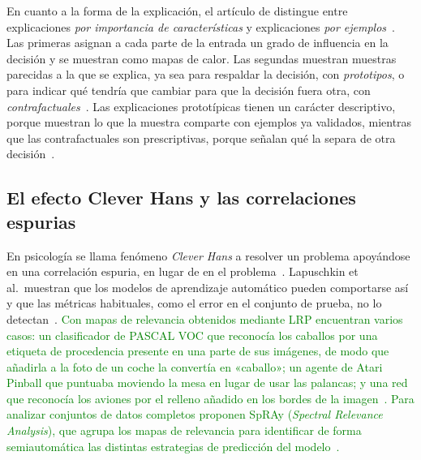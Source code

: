 En cuanto a la forma de la explicación, el artículo de \stoodx distingue entre
explicaciones \emph{por importancia de características} y explicaciones
\emph{por ejemplos}~\cite{sevillano2026}. Las primeras asignan a cada parte de la
entrada un grado de influencia en la decisión y se muestran como mapas de calor.
Las segundas muestran muestras parecidas a la que se explica, ya sea para
respaldar la decisión, con \emph{prototipos}, o para indicar qué tendría que
cambiar para que la decisión fuera otra, con
\emph{contrafactuales}~\cite{sevillano2026}. Las explicaciones prototípicas tienen
un carácter descriptivo, porque muestran lo que la muestra comparte con ejemplos
ya validados, mientras que las contrafactuales son prescriptivas, porque señalan
qué la separa de otra decisión~\cite{sevillano2025tesis}.

\subsection{El efecto Clever Hans y las correlaciones espurias}\label{sec:ea-clever-hans}

En psicología se llama fenómeno \emph{Clever Hans} a resolver un problema
apoyándose en una correlación espuria, en lugar de en el
problema~\cite{lapuschkin2019}. Lapuschkin et al.\ muestran que los modelos de
aprendizaje automático pueden comportarse así y que las métricas habituales, como
el error en el conjunto de prueba, no lo detectan~\cite{lapuschkin2019}.\textcolor{green}{ Con
mapas de relevancia obtenidos mediante LRP encuentran varios casos: un
clasificador de PASCAL VOC que reconocía los caballos por una etiqueta de
procedencia presente en una parte de sus imágenes, de modo que añadirla a la foto de
un coche la convertía en «caballo»; un agente de Atari Pinball que puntuaba
moviendo la mesa en lugar de usar las palancas; y una red que reconocía los aviones
por el relleno añadido en los bordes de la imagen~\cite{lapuschkin2019}. Para
analizar conjuntos de datos completos proponen SpRAy (\emph{Spectral Relevance
Analysis}), que agrupa los mapas de relevancia para identificar de forma
semiautomática las distintas estrategias de predicción del
modelo~\cite{lapuschkin2019}.}

